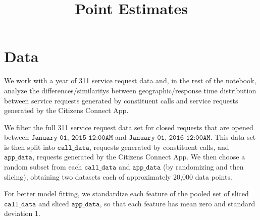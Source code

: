 \documentclass{article}
\title{Point Estimates}
\author{}
\date{}
\theoremstyle{theorem}
\theoremstyle{theorem}
\theoremstyle{theorem}
\theoremstyle{lemma}
\theoremstyle{definition}
\theoremstyle{example}
\begin{document}
\maketitle


\section{Data}
We work with a year of 311 service request data and, in the rest of the notebook, analyze the differences/similaritys between geographic/response time distribution between service requests generated by constituent calls and service requests generated by the Citizens Connect App.

We filter the full 311 service request data set for closed requests that are opened between $\texttt{January 01, 2015 12:00AM}$ and $\texttt{January 01, 2016 12:00AM}$. This data set is then split into $\texttt{call\_data}$, requests generated by constituent calls, and $\texttt{app\_data}$, requests generated by the Citizens Connect App. We then choose a random subset from each $\texttt{call\_data}$ and $\texttt{app\_data}$ (by randomizing and then slicing), obtaining two datasets each of approximately 20,000 data points.

For better model fitting, we standardize each feature of the pooled set of sliced $\texttt{call\_data}$ and sliced $\texttt{app\_data}$, so that each feature has mean zero and standard deviation 1. 
\end{document}
